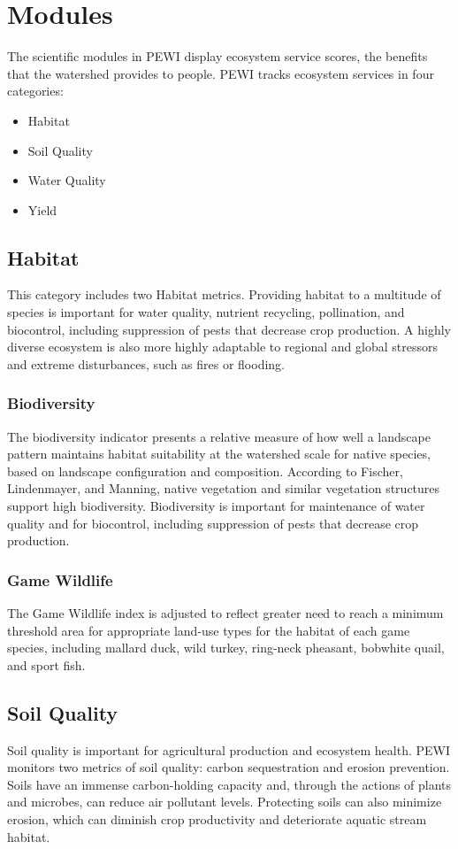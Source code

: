 \documentclass[11pt]{article}
\begin{document}
\section{Modules}
The scientific modules in PEWI display ecosystem service scores, the benefits that the watershed provides to people. PEWI tracks ecosystem services in four categories: 
\begin{itemize}
\item Habitat
\item Soil Quality
\item Water Quality
\item Yield
\end{itemize}
\subsection{Habitat}
This category includes two Habitat metrics. Providing habitat to a multitude of species is important for water quality, nutrient recycling, pollination, and biocontrol, including suppression of pests that decrease crop production. A highly diverse ecosystem is also more highly adaptable to regional and global stressors and extreme disturbances, such as fires or flooding.

\subsubsection{Biodiversity}
The biodiversity indicator presents a relative measure of how well a landscape pattern maintains habitat suitability at the watershed scale for native species, based on landscape configuration and composition.  According to Fischer, Lindenmayer, and Manning, native vegetation and similar vegetation structures support high biodiversity.\cite{34}  Biodiversity is important for maintenance of water quality and for biocontrol, including suppression of pests that decrease crop production.\cite{35} 

\subsubsection{Game Wildlife}
  The Game Wildlife index is adjusted to reflect greater need to reach a minimum threshold area for appropriate land-use types for the habitat of each game species, including mallard duck, wild turkey, ring-neck pheasant, bobwhite quail, and sport fish. 
  
\subsection{Soil Quality}
 Soil quality is important for agricultural production and ecosystem health. PEWI monitors two metrics of soil quality: carbon sequestration and erosion prevention. Soils have an immense carbon-holding capacity and, through the actions of plants and microbes, can reduce air pollutant levels. Protecting soils can also minimize erosion, which can diminish crop productivity and deteriorate aquatic stream habitat.\cite{36} 
 
\end{document}
